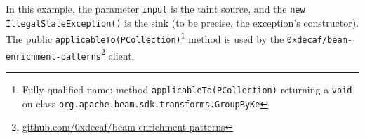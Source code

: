 




In this example, the parameter \texttt{input} is the taint source, and the \texttt{new IllegalStateException()} is the sink (to be precise, the exception's constructor). The public \texttt{applicableTo(PCollection)}\footnote{Fully-qualified name: method \texttt{applicableTo(PCollection)} returning a \texttt{void} on class \texttt{org.apache.beam.sdk.transforms.GroupByKe}} method is used by the \texttt{0xdecaf/beam-enrichment-patterns}\footnote{\url{github.com/0xdecaf/beam-enrichment-patterns}} client.


